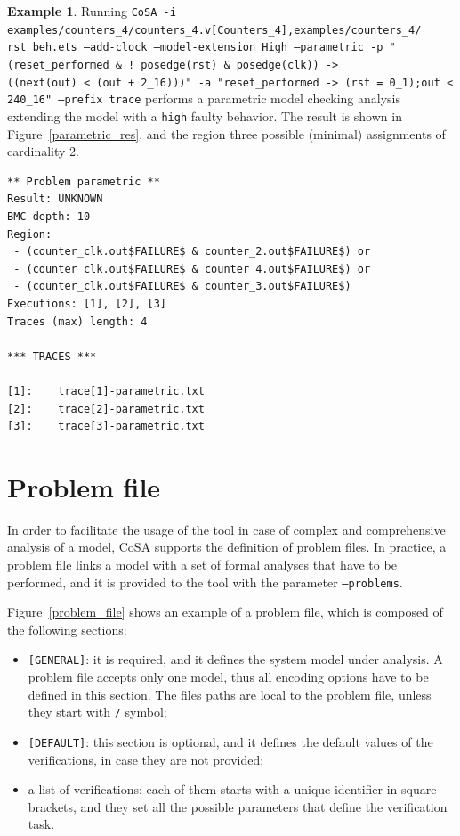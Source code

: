 \documentclass{article}
\theoremstyle{definition}
\newtheorem{example}{Example}[section]
\begin{document}
\begin{example}
\label{ex:param_extended}
  Running \texttt{CoSA -i
    examples/counters\_4/counters\_4.v[Counters\_4],examples/counters\_4/
    rst\_beh.ets --add-clock --model-extension High --parametric -p
    "(reset\_performed \& ! posedge(rst) \& posedge(clk))
    ->\\ ((next(out) < (out + 2\_16)))" -a "reset\_performed -> (rst =
    0\_1);out < 240\_16" --prefix trace} performs a parametric model
  checking analysis extending the model with a \texttt{high} faulty
  behavior. The result is shown in Figure~\ref{parametric_res}, and
  the region three possible (minimal) assignments of cardinality 2.

\begin{lstlisting}[frame=single,language=ets,caption=Parametric analysis example,label=parametric_res]
** Problem parametric **
Result: UNKNOWN
BMC depth: 10
Region:
 - (counter_clk.out$FAILURE$ & counter_2.out$FAILURE$) or 
 - (counter_clk.out$FAILURE$ & counter_4.out$FAILURE$) or 
 - (counter_clk.out$FAILURE$ & counter_3.out$FAILURE$)
Executions: [1], [2], [3]
Traces (max) length: 4

*** TRACES ***

[1]:	trace[1]-parametric.txt
[2]:	trace[2]-parametric.txt
[3]:	trace[3]-parametric.txt
\end{lstlisting}

\end{example}

\section{Problem file}
\label{sec:problem_file}

In order to facilitate the usage of the tool in case of complex and
comprehensive analysis of a model, CoSA supports the definition of
problem files. In practice, a problem file links a model with a set of
formal analyses that have to be performed, and it is provided to the
tool with the parameter \texttt{--problems}.

Figure~\ref{problem_file} shows an example of a problem file, which is
composed of the following sections:
\begin{itemize}
\item \texttt{[GENERAL]}: it is required, and it defines the system
  model under analysis. A problem file accepts only one model, thus
  all encoding options have to be defined in this section. The files
  paths are local to the problem file, unless they start with
  \texttt{/} symbol;
\item \texttt{[DEFAULT]}: this section is optional, and it defines the
  default values of the verifications, in case they are not provided;
\item a list of verifications: each of them starts with a unique
  identifier in square brackets, and they set all the possible
  parameters that define the verification task.
\end{itemize}
\end{document}
